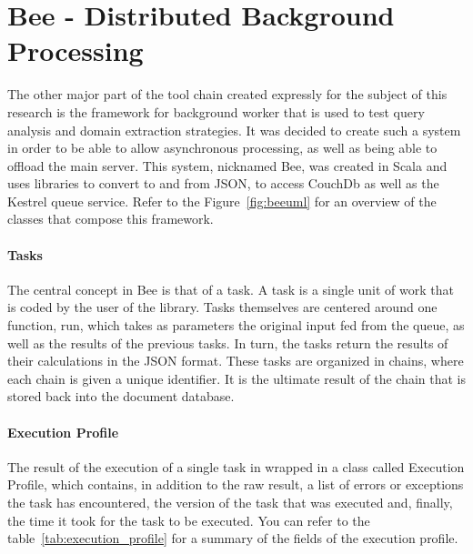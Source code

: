 
\section{Bee - Distributed Background Processing} %
\label{sec:bee_distributed_background_processing}

The other major part of the tool chain created expressly for the subject of this research is the framework for background worker that is used to test query analysis and domain extraction strategies. It was decided to create such a system in order to be able to allow asynchronous processing, as well as being able to offload the main server. This system, nicknamed Bee, was created in Scala and uses libraries to convert to and from JSON, to access CouchDb as well as the Kestrel queue service. Refer to the Figure~\ref{fig:beeuml} for an overview of the classes that compose this framework.

\paragraph{Tasks} %
\label{par:tasks}

The central concept in Bee is that of a task. A task is a single unit of work that is coded by the user of the library.  Tasks themselves are centered around one function, run, which takes as parameters the original input fed from the queue, as well as the results of the previous tasks. In turn, the tasks return the results of their calculations in the JSON format. These tasks are organized in chains, where each chain is given a unique identifier. It is the ultimate result of the chain that is stored back into the document database.


\paragraph{Execution Profile} %
\label{par:execution_profile}

The result of the execution of a single task in wrapped in a class called Execution Profile, which contains, in addition to the raw result, a list of errors or exceptions the task has encountered, the version of the task that was executed and, finally, the time it took for the task to be executed. You can refer to the table~\ref{tab:execution_profile} for a summary of the fields of the execution profile.

